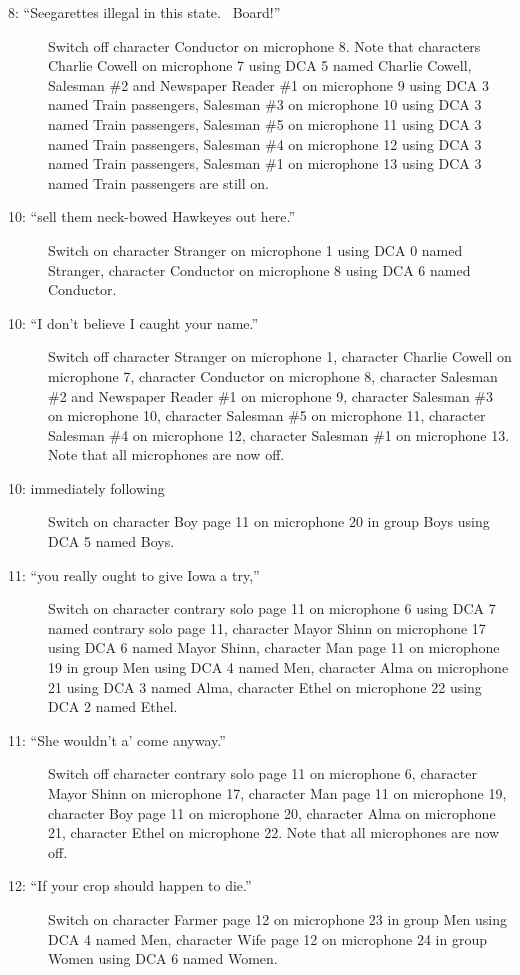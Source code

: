 \begin{description}
\item[8: ``Seegarettes illegal in this state.~ Board!'']
Switch off character Conductor on microphone 8. Note that characters Charlie Cowell on microphone 7 using DCA 5 named Charlie Cowell, Salesman \#2 and Newspaper Reader \#1 on microphone 9 using DCA 3 named Train passengers, Salesman \#3 on microphone 10 using DCA 3 named Train passengers, Salesman \#5 on microphone 11 using DCA 3 named Train passengers, Salesman \#4 on microphone 12 using DCA 3 named Train passengers, Salesman \#1 on microphone 13 using DCA 3 named Train passengers are still on.  

\item[10: ``sell them neck-bowed Hawkeyes out here.'']
Switch on character Stranger on microphone 1 using DCA 0 named Stranger, character Conductor on microphone 8 using DCA 6 named Conductor. 

\item[10: ``I don't believe I caught your name.'']
Switch off character Stranger on microphone 1, character Charlie Cowell on microphone 7, character Conductor on microphone 8, character Salesman \#2 and Newspaper Reader \#1 on microphone 9, character Salesman \#3 on microphone 10, character Salesman \#5 on microphone 11, character Salesman \#4 on microphone 12, character Salesman \#1 on microphone 13. Note that all microphones are now off.

\item[10: immediately following]
Switch on character Boy page 11 on microphone 20 in group Boys using DCA 5 named Boys. 

\item[11: ``you really ought to give Iowa a try,'']
Switch on character contrary solo page 11 on microphone 6 using DCA 7 named contrary solo page 11, character Mayor Shinn on microphone 17 using DCA 6 named Mayor Shinn, character Man page 11 on microphone 19 in group Men using DCA 4 named Men, character Alma on microphone 21 using DCA 3 named Alma, character Ethel on microphone 22 using DCA 2 named Ethel. 

\item[11: ``She wouldn't a' come anyway.'']
Switch off character contrary solo page 11 on microphone 6, character Mayor Shinn on microphone 17, character Man page 11 on microphone 19, character Boy page 11 on microphone 20, character Alma on microphone 21, character Ethel on microphone 22. Note that all microphones are now off.

\item[12: ``If your crop should happen to die.'']
Switch on character Farmer page 12 on microphone 23 in group Men using DCA 4 named Men, character Wife page 12 on microphone 24 in group Women using DCA 6 named Women. 


\end{description}
